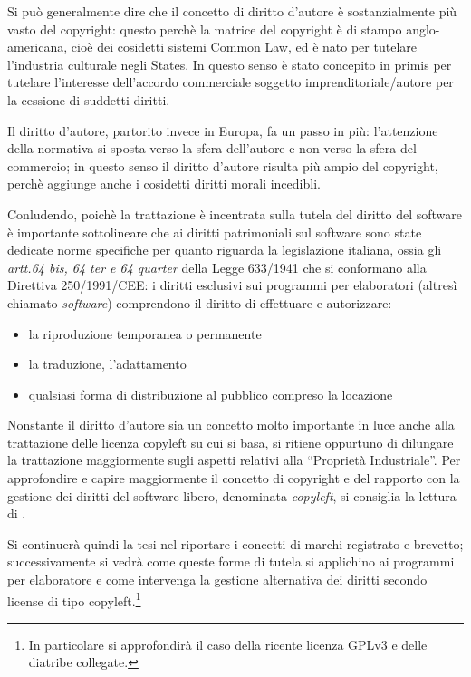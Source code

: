 Si può generalmente dire che il concetto di diritto d’autore è sostanzialmente più vasto del copyright: questo perchè
la matrice del copyright è di stampo anglo-americana, cioè dei cosidetti sistemi Common Law, ed è nato per tutelare l’industria culturale negli States. In questo senso è stato concepito in primis per tutelare l’interesse dell'accordo commerciale soggetto imprenditoriale/autore per la cessione di suddetti diritti.

Il diritto d’autore, partorito invece in Europa, fa un passo in più: l’attenzione della normativa si sposta verso la sfera dell’autore e non verso la sfera del commercio; in questo senso il diritto d’autore risulta più ampio del copyright, perchè aggiunge anche i cosidetti diritti morali incedibli.

Conludendo, poichè la trattazione è incentrata sulla tutela del diritto del software è importante sottolineare che ai diritti patrimoniali sul software sono state dedicate norme specifiche per quanto riguarda la legislazione italiana, ossia gli \textit{artt.64 bis, 64 ter e 64 quarter} della Legge 633/1941 che si conformano alla Direttiva 250/1991/CEE: i diritti esclusivi sui programmi per elaboratori (altresì chiamato \textit{software}) comprendono il diritto di effettuare e autorizzare:

\begin{itemize}
\item la riproduzione temporanea o permanente
\item la traduzione, l’adattamento
\item qualsiasi forma di distribuzione al pubblico compreso la locazione
\end{itemize}

Nonstante il diritto d'autore sia un concetto molto importante in luce anche alla trattazione delle licenza copyleft su cui si basa, si ritiene oppurtuno di dilungare la trattazione maggiormente sugli aspetti relativi alla ``Proprietà Industriale''. Per approfondire e capire maggiormente il concetto di copyright e del rapporto con la gestione dei diritti del software libero, denominata \textit{copyleft}, si consiglia la lettura di \cite[Simone Aliprandi - Teoria e Pratica del copyleft]{Aliprandi-copyleft2}.

Si continuerà quindi la tesi nel riportare i concetti di marchi registrato e brevetto; successivamente si vedrà come queste forme di tutela si applichino ai programmi per elaboratore e come intervenga la gestione alternativa dei diritti secondo license di tipo copyleft.\footnote{In particolare si approfondirà il caso della ricente licenza GPLv3 e delle diatribe collegate.}


